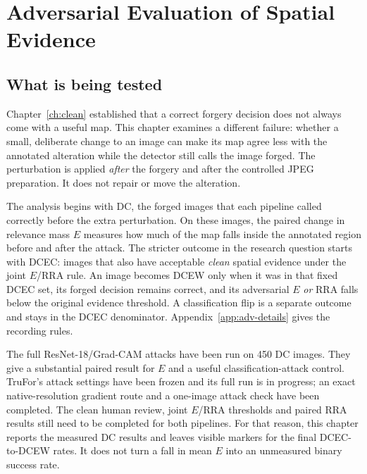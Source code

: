 
\chapter{Adversarial Evaluation of Spatial Evidence}
\label{ch:adversarial}

\section{What is being tested}
\label{sec:adv-question}

Chapter~\ref{ch:clean} established that a correct forgery decision does not always come with a useful map. This chapter examines a different failure: whether a small, deliberate change to an image can make its map agree less with the annotated alteration while the detector still calls the image forged. The perturbation is applied \emph{after} the forgery and after the controlled JPEG preparation. It does not repair or move the alteration.

The analysis begins with DC, the forged images that each pipeline called correctly before the extra perturbation. On these images, the paired change in relevance mass $E$ measures how much of the map falls inside the annotated region before and after the attack. The stricter outcome in the research question starts with DCEC: images that also have acceptable \emph{clean} spatial evidence under the joint $E$/RRA rule. An image becomes DCEW only when it was in that fixed DCEC set, its forged decision remains correct, and its adversarial $E$ \emph{or} RRA falls below the original evidence threshold. A classification flip is a separate outcome and stays in the DCEC denominator. Appendix~\ref{app:adv-details} gives the recording rules.

The full ResNet-18/Grad-CAM attacks have been run on 450 DC images. They give a substantial paired result for $E$ and a useful classification-attack control. TruFor's attack settings have been frozen and its full run is in progress; an exact native-resolution gradient route and a one-image attack check have been completed. The clean human review, joint $E$/RRA thresholds and paired RRA results still need to be completed for both pipelines. For that reason, this chapter reports the measured DC results and leaves visible markers for the final DCEC-to-DCEW rates. It does not turn a fall in mean $E$ into an unmeasured binary success rate.

